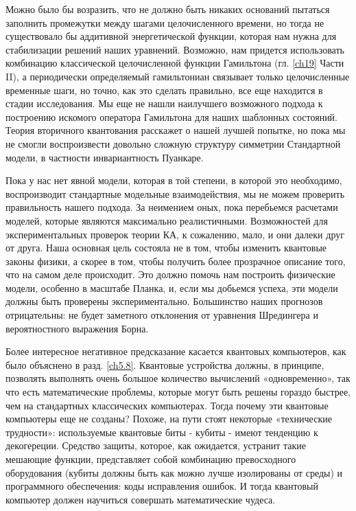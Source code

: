 \documentclass[main.tex]{subfiles}
\begin{document}
Можно было бы возразить, что не должно быть никаких оснований пытаться заполнить промежутки между шагами целочисленного времени, но тогда не существовало бы аддитивной энергетической функции, которая нам нужна для стабилизации решений наших уравнений. Возможно, нам придется использовать комбинацию классической целочисленной функции Гамильтона (гл. \ref{ch19} Части II), а периодически определяемый гамильтониан связывает только целочисленные временные шаги, но точно, как это сделать правильно, все еще находится в стадии исследования. Мы еще не нашли наилучшего возможного подхода к построению искомого оператора Гамильтона для наших шаблонных состояний. Теория вторичного квантования расскажет о нашей лучшей попытке, но пока мы не смогли воспроизвести довольно сложную структуру симметрии Стандартной модели, в частности инвариантность Пуанкаре.

Пока у нас нет явной модели, которая в той степени, в которой это необходимо, воспроизводит стандартные модельные взаимодействия, мы не можем проверить правильность нашего подхода. За неимением оных, пока перебьемся расчетами моделей, которые являются максимально реалистичными.
Возможностей для экспериментальных проверок теории КА, к сожалению, мало, и они далеки друг от друга. Наша основная цель состояла не в том, чтобы изменить квантовые законы физики, а скорее в том, чтобы получить более прозрачное описание того, что на самом деле происходит. Это должно помочь нам построить физические модели, особенно в масштабе Планка, и, если мы добьемся успеха, эти модели должны быть проверены экспериментально. Большинство наших прогнозов отрицательны: не будет заметного отклонения от уравнения Шредингера и вероятностного выражения Борна.

Более интересное негативное предсказание касается квантовых компьютеров, как было объяснено в разд. \ref{ch5.8}. Квантовые устройства должны, в принципе, позволять выполнять очень большое количество вычислений «одновременно», так что есть математические проблемы, которые могут быть решены гораздо быстрее, чем на стандартных классических компьютерах. Тогда почему эти квантовые компьютеры еще не созданы? Похоже, на пути стоят некоторые «технические трудности»: используемые квантовые биты - кубиты - имеют тенденцию к декогереции. Средство защиты, которое, как ожидается, устранит такие мешающие функции, представляет собой комбинацию превосходного оборудования (кубиты должны быть как можно лучше изолированы от среды) и программного обеспечения: коды исправления ошибок. И тогда квантовый компьютер должен научиться совершать математические чудеса.
\end{document}
